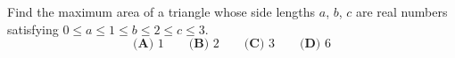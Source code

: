 Find the maximum area of a triangle whose side lengths $a$, $b$, $c$ are real numbers satisfying $0\le a\le1\le b\le2\le c\le3$.
\[
\textbf{(A) }1\qquad\textbf{(B) }2\qquad\textbf{(C) }3\qquad\textbf{(D) }6
\]
